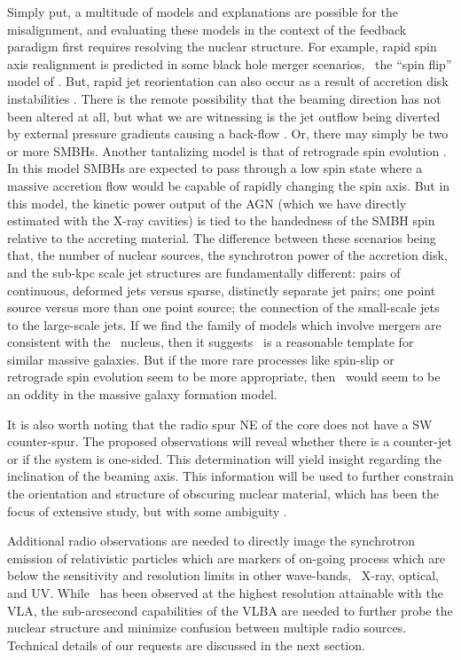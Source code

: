 \documentclass[11pt]{article}
\begin{document}
Simply put, a multitude of models and explanations are possible for
the misalignment, and evaluating these models in the context of the
feedback paradigm first requires resolving the nuclear structure. For
example, rapid spin axis realignment is predicted in some black hole
merger scenarios, \eg\ the ``spin flip'' model of
\cite{merritt02}. But, rapid jet reorientation can also occur as a
result of accretion disk instabilities \cite{dennett02}. There is the
remote possibility that the beaming direction has not been altered at
all, but what we are witnessing is the jet outflow being diverted by
external pressure gradients causing a back-flow
\cite[\eg][]{worrall95}. Or, there may simply be two or more
SMBHs. Another tantalizing model is that of retrograde spin evolution
\cite{garofalo10}. In this model SMBHs are expected to pass through a
low spin state where a massive accretion flow would be capable of
rapidly changing the spin axis. But in this model, the kinetic power
output of the AGN (which we have directly estimated with the X-ray
cavities) is tied to the handedness of the SMBH spin relative to the
accreting material. The difference between these scenarios being that,
the number of nuclear sources, the synchrotron power of the accretion
disk, and the sub-kpc scale jet structures are fundamentally
different: pairs of continuous, deformed jets versus sparse,
distinctly separate jet pairs; one point source versus more than one
point source; the connection of the small-scale jets to the
large-scale jets. If we find the family of models which involve
mergers are consistent with the \irs\ nucleus, then it suggests
\irs\ is a reasonable template for similar massive galaxies. But if
the more rare processes like spin-slip or retrograde spin evolution
seem to be more appropriate, then \irs\ would seem to be an oddity in
the massive galaxy formation model.

It is also worth noting that the radio spur NE of the core does not
have a SW counter-spur. The proposed observations will reveal whether
there is a counter-jet or if the system is one-sided. This
determination will yield insight regarding the inclination of the
beaming axis. This information will be used to further constrain the
orientation and structure of obscuring nuclear material, which has
been the focus of extensive study, but with some ambiguity
\cite[\eg][]{tran00, taniguchi97}.

Additional radio observations are needed to directly image the
synchrotron emission of relativistic particles which are markers of
on-going process which are below the sensitivity and resolution limits
in other wave-bands, \ie\ X-ray, optical, and UV. While \irs\ has been
observed at the highest resolution attainable with the VLA, the
sub-arcsecond capabilities of the VLBA are needed to further probe the
nuclear structure and minimize confusion between multiple radio
sources. Technical details of our requests are discussed in the next
section.\\
\end{document}
